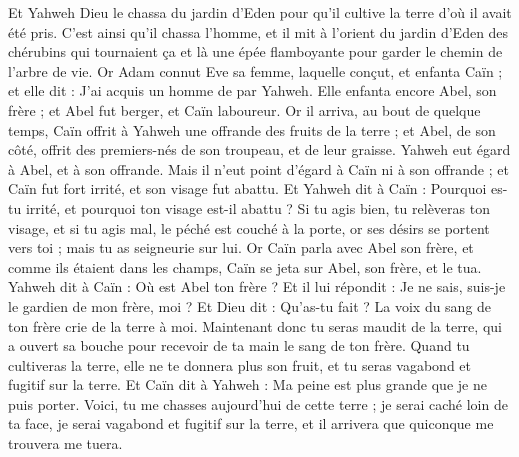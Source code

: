 \begin{multicols}{2}
Et Yahweh Dieu le chassa du jardin d'Eden pour qu'il cultive la terre d'où il avait été pris.
C'est ainsi qu'il chassa l'homme, et il mit à l'orient du jardin d'Eden des chérubins qui tournaient ça et là une épée flamboyante pour garder le chemin de l'arbre de vie.
\VerseOne{}Or Adam connut Eve sa femme, laquelle conçut, et enfanta Caïn ; et elle dit : J'ai acquis un homme de par Yahweh.
Elle enfanta encore Abel, son frère ; et Abel fut berger, et Caïn laboureur.
Or il arriva, au bout de quelque temps, Caïn offrit à Yahweh une offrande des fruits de la terre ;
et Abel, de son côté, offrit des premiers-nés de son troupeau, et de leur graisse. Yahweh eut égard à Abel, et à son offrande.
Mais il n'eut point d'égard à Caïn ni à son offrande ; et Caïn fut fort irrité, et son visage fut abattu.
Et Yahweh dit à Caïn : Pourquoi es-tu irrité, et pourquoi ton visage est-il abattu ?
Si tu agis bien, tu relèveras ton visage, et si tu agis mal, le péché est couché à la porte, or ses désirs se portent vers toi ; mais tu as seigneurie sur lui.
Or Caïn parla avec Abel son frère, et comme ils étaient dans les champs, Caïn se jeta sur Abel, son frère, et le tua.
Yahweh dit à Caïn : Où est Abel ton frère ? Et il lui répondit : Je ne sais, suis-je le gardien de mon frère, moi ?
Et Dieu dit : Qu'as-tu fait ? La voix du sang de ton frère crie de la terre à moi.
Maintenant donc tu seras maudit de la terre, qui a ouvert sa bouche pour recevoir de ta main le sang de ton frère.
Quand tu cultiveras la terre, elle ne te donnera plus son fruit, et tu seras vagabond et fugitif sur la terre.
Et Caïn dit à Yahweh : Ma peine est plus grande que je ne puis porter.
Voici, tu me chasses aujourd'hui de cette terre ; je serai caché loin de ta face, je serai vagabond et fugitif sur la terre, et il arrivera que quiconque me trouvera me tuera.

\end{multicols}
